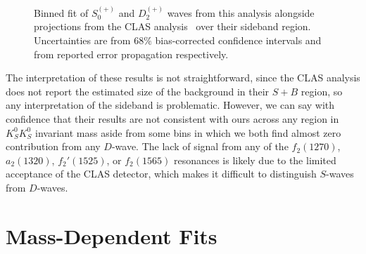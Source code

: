 \begin{figure}
  \begin{center}
    
  \end{center}
  \caption{Binned fit of $S_0^{(+)}$ and $D_2^{(+)}$ waves from this analysis alongside projections from the CLAS analysis~\cite{Chandavar2018} over their sideband region. Uncertainties are from $68\%$ bias-corrected confidence intervals and from reported error propagation respectively.}\label{fig:clas-comparison-sideband}
\end{figure}

The interpretation of these results is not straightforward, since the CLAS analysis does not report the estimated size of the background in their $S+B$ region, so any interpretation of the sideband is problematic. However, we can say with confidence that their results are not consistent with ours across any region in $K_S^0K_S^0$ invariant mass aside from some bins in which we both find almost zero contribution from any $D$-wave. The lack of signal from any of the $f_2(1270)$, $a_2(1320)$, $f_2'(1525)$, or $f_2(1565)$ resonances is likely due to the limited acceptance of the CLAS detector, which makes it difficult to distinguish $S$-waves from $D$-waves.


\section{Mass-Dependent Fits}\label{sec:mass-dependent-fits}

